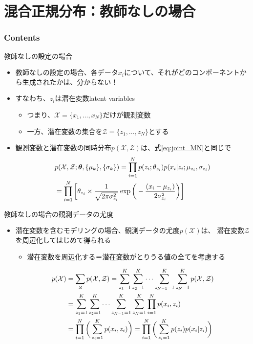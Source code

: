 \documentclass[aspectratio=169,unicode,dvipdfmx,14pt]{beamer}
\begin{document}
\section{混合正規分布：教師なしの場合}

\begin{frame}\frametitle{Contents}
\Large \tableofcontents[currentsection]
\end{frame}


\begin{frame}{教師なしの設定の場合}
\vspace{-.05in}
\begin{itemize}
\item 教師なしの設定の場合、各データ$x_i$について、それがどのコンポーネントから生成されたかは、分からない！
\item すなわち、$z_i$は潜在変数latent variables
\begin{itemize}
\item つまり、$\mathcal{X} = \{ x_1, \ldots, x_N \}$だけが観測変数
\item 一方、潜在変数の集合を$\mathcal{Z} = \{ z_1, \ldots, z_N \}$とする
\end{itemize}
\item 観測変数と潜在変数の同時分布$p(\mathcal{X}, \mathcal{Z})$は、式\eqref{eq:joint_MN}と同じで
\vspace{-.13in}
\begin{align}
& p(\mathcal{X}, \mathcal{Z};\bm{\theta},\{ \mu_k \}, \{ \sigma_k \})
= \prod_{i=1}^N p(z_i ; \theta_{z_i}) p(x_i | z_i ; \mu_{z_i}, \sigma_{z_i})
\notag \\ &
= \prod_{i=1}^N \bigg[ \theta_{z_i} \times \frac{1}{\sqrt{2\pi\sigma_{z_i}^2}}\exp\bigg( - \frac{(x_i - \mu_{z_i})}{2\sigma_{z_i}^2} \bigg) \bigg]
\notag
\end{align}
\end{itemize}
\end{frame}

\begin{frame}{教師なしの場合の観測データの尤度}
\begin{itemize}
\item 潜在変数を含むモデリングの場合、観測データの尤度$p(\mathcal{X})$は、
潜在変数$\mathcal{Z}$を周辺化してはじめて得られる
\begin{itemize}
\item 潜在変数を周辺化する＝潜在変数がとりうる値の全てを考慮する
\end{itemize}
\begin{align}
p(\mathcal{X}) & = \sum_{\mathcal{Z}} p(\mathcal{X}, \mathcal{Z})
= \sum_{z_1=1}^K \sum_{z_2=1}^K \cdots \sum_{z_{N-1}=1}^K \sum_{z_N=1}^K p(\mathcal{X}, \mathcal{Z})
\notag \\ &
= \sum_{z_1=1}^K \sum_{z_2=1}^K \cdots \sum_{z_{N-1}=1}^K \sum_{z_N=1}^K \prod_{i=1}^N p(x_i, z_i)
\notag \\ &
= \prod_{i=1}^N \bigg( \sum_{z_i=1}^K p(x_i , z_i) \bigg)
= \prod_{i=1}^N \bigg( \sum_{z_i=1}^K p(z_i) p(x_i | z_i) \bigg)
\label{eq:LH_mixture}
\end{align}
\end{itemize}
\end{frame}
\end{document}
